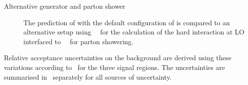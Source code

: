 \begin{description}
\item[Alternative generator and parton shower] The prediction of \Zjets with the
  default configuration of \SHERPA[2.2.1] is compared to an alternative setup
  using~\MGNLO[2.2.2]~\cite{Alwall:2014hca} for the calculation of the hard
  interaction at LO interfaced to~\PYTHIA[8.186]~\cite{Sjostrand:2007gs} for
  parton showering.

\end{description}
Relative acceptance uncertainties on the \ZHF background are derived using these
variations according to~ for the three
signal regions. The uncertainties are summarised
in~ separately for all sources of
uncertainty.


